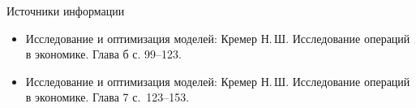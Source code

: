 \documentclass[unicode,11pt,notheorems,xcolor=table]{beamer}
\begin{document}
\begin{frame}{Источники информации}
\begin{itemize}
\item {}
	Исследование и оптимизация моделей:  Кремер  Н.\,Ш. Исследование операций в экономике. Глава б с. 99--123.
\item {}
	Исследование и оптимизация моделей:  Кремер  Н.\,Ш. Исследование операций в экономике. Глава 7 с.~123--153.
\end{itemize}

\end{frame}
\end{document}
